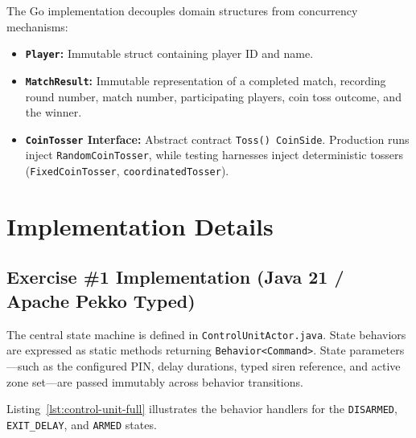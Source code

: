 \documentclass[11pt,a4paper]{article}
\begin{document}
The Go implementation decouples domain structures from concurrency mechanisms:
\begin{itemize}[leftmargin=*]
    \item \textbf{\texttt{Player}:} Immutable struct containing player ID and name.
    \item \textbf{\texttt{MatchResult}:} Immutable representation of a completed match, recording round number, match number, participating players, coin toss outcome, and the winner.
    \item \textbf{\texttt{CoinTosser} Interface:} Abstract contract \texttt{Toss() CoinSide}. Production runs inject \texttt{RandomCoinTosser}, while testing harnesses inject deterministic tossers (\texttt{FixedCoinTosser}, \texttt{coordinatedTosser}).
\end{itemize}

\section{Implementation Details}

\subsection{Exercise \#1 Implementation (Java 21 / Apache Pekko Typed)}

The central state machine is defined in \texttt{ControlUnitActor.java}. State behaviors are expressed as static methods returning \texttt{Behavior<Command>}. State parameters—such as the configured PIN, delay durations, typed siren reference, and active zone set—are passed immutably across behavior transitions.

Listing~\ref{lst:control-unit-full} illustrates the behavior handlers for the \texttt{DISARMED}, \texttt{EXIT\_DELAY}, and \texttt{ARMED} states.
\end{document}
